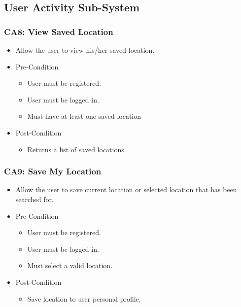 \documentclass[12pt,a4paper]{article}
\begin{document}
	\subsection{User Activity Sub-System}
		\subsubsection{CA8: View Saved Location}
			\begin{itemize}
				\item Allow the user to view his/her saved location.
				\item Pre-Condition
					\begin{itemize}
						\item User must be registered.
						\item User must be logged in.
						\item Must have at least one saved location
					\end{itemize}
				\item Post-Condition
					\begin{itemize}
						\item Returns a list of saved locations.
					\end{itemize}
			\end{itemize}
		\subsubsection{CA9: Save My Location}
			\begin{itemize}
				\item Allow the user to save current location or selected location that has been searched for.
				\item Pre-Condition
					\begin{itemize}
						\item User must be registered.
						\item User must be logged in.
						\item Must select a valid location.
					\end{itemize}
				\item Post-Condition
					\begin{itemize}
						\item Save location to user personal profile.
					\end{itemize}
			\end{itemize}
\end{document}
